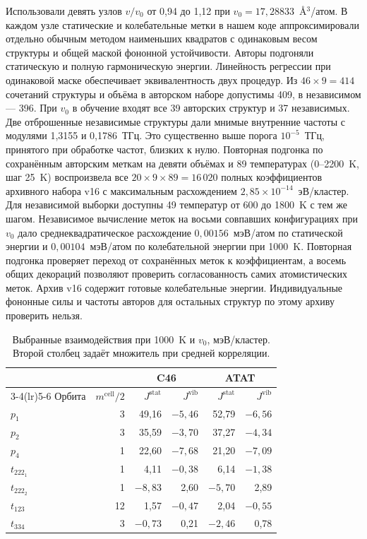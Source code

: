 Использовали девять узлов \(v/v_0\) от 0,94 до 1,12 при
\(v_0=17{,}28833\)~\AA\({}^3\)/атом. В каждом узле статические и
колебательные метки в нашем коде аппроксимировали отдельно обычным
методом наименьших квадратов с одинаковым весом структуры и общей
маской фононной устойчивости. Авторы подгоняли статическую и полную
гармоническую энергии. Линейность регрессии при одинаковой маске
обеспечивает эквивалентность двух процедур. Из \(46\times9=414\)
сочетаний структуры и объёма в
авторском наборе допустимы 409, в независимом --- 396. При \(v_0\)
в обучение входят все 39 авторских структур и 37 независимых. Две
отброшенные независимые структуры дали мнимые внутренние частоты с
модулями 1,3155 и 0,1786~ТГц. Это существенно выше порога
\(10^{-5}\)~ТГц, принятого при обработке частот, близких к нулю.
Повторная подгонка по сохранённым авторским меткам на девяти объёмах и
89 температурах (0--2200~K, шаг 25~K) воспроизвела все
\(20\times9\times89=16\,020\) полных коэффициентов архивного набора
v16 с максимальным расхождением \(2{,}85\times10^{-14}\)~эВ/кластер.
Для независимой выборки доступны 49 температур от 600 до 1800~K с тем же
шагом. Независимое вычисление меток на восьми совпавших конфигурациях
при \(v_0\) дало среднеквадратическое расхождение \(0{,}00156\)~мэВ/атом
по статической энергии и \(0{,}00104\)~мэВ/атом по колебательной
энергии при 1000~K. Повторная подгонка проверяет переход от сохранённых
меток к коэффициентам, а восемь общих декораций позволяют проверить
согласованность самих атомистических меток. Архив v16 содержит готовые
колебательные энергии. Индивидуальные фононные силы и частоты авторов
для остальных структур по этому архиву проверить нельзя.

\begin{table}[htbp]
\centering\small
\caption{Выбранные взаимодействия при 1000~K и \(v_0\), мэВ/кластер.
Второй столбец задаёт множитель при средней корреляции.}
\label{tab:ce-model-coeff}
\begin{tabular}{lrrrrr}
\toprule
 & & \multicolumn{2}{c}{C46} & \multicolumn{2}{c}{ATAT}\\
\cmidrule(lr){3-4}\cmidrule(lr){5-6}
Орбита & \(m^{\mathrm{cell}}/2\) &
\(J^{\mathrm{stat}}\) & \(J^{\mathrm{vib}}\) &
\(J^{\mathrm{stat}}\) & \(J^{\mathrm{vib}}\)\\
\midrule
\(p_1\) & 3 & 49,16 & \(-5{,}46\) & 52,79 & \(-6{,}56\)\\
\(p_2\) & 3 & 35,59 & \(-3{,}70\) & 37,27 & \(-4{,}34\)\\
\(p_4\) & 1 & 22,60 & \(-7{,}68\) & 21,20 & \(-7{,}09\)\\
\(t_{222_1}\) & 1 & 4,11 & \(-0{,}38\) & 6,14 & \(-1{,}38\)\\
\(t_{222_2}\) & 1 & \(-8{,}83\) & 2,60 & \(-5{,}70\) & 2,89\\
\(t_{123}\) & 12 & 1,57 & \(-0{,}47\) & 2,04 & \(-0{,}55\)\\
\(t_{334}\) & 3 & \(-0{,}73\) & 0,21 & \(-2{,}46\) & 0,78\\
\bottomrule
\end{tabular}
\end{table}

